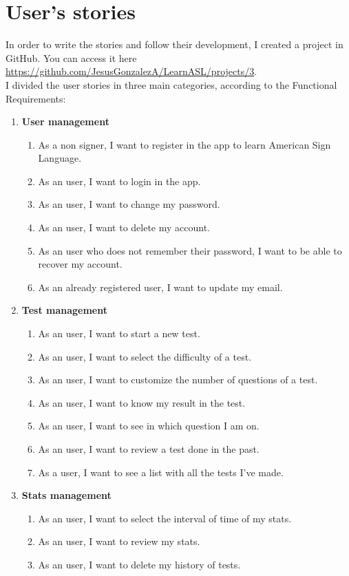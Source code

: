 \section{User's stories}
In order to write the stories and follow their development, I created a project in GitHub. You can access it here \url{https://github.com/JesusGonzalezA/LearnASL/projects/3}. \\

I divided the user stories in three main categories, according to the Functional Requirements:
\begin{enumerate}[label=\textbf{US\_\arabic*}, align=left, leftmargin=*]
    \item \textbf{User management} 
        \begin{enumerate}[label=\textbf{\theenumi.\arabic*}, align=left, leftmargin=*]
            \item As a non signer, I want to register in the app to learn American Sign Language.
            \item As an user, I want to login in the app.
            \item As an user, I want to change my password.
            \item As an user, I want to delete my account.
            \item As an user who does not remember their password, I want to be able to recover my account.
            \item As an already registered user, I want to update my email.
        \end{enumerate}
    \item \textbf{Test management} 
        \begin{enumerate}[label=\textbf{\theenumi.\arabic*}, align=left, leftmargin=*]
            \item As an user, I want to start a new test.
            \item As an user, I want to select the difficulty of a test.
            \item As an user, I want to customize the number of questions of a test.
            \item As an user, I want to know my result in the test.
            \item As an user, I want to see in which question I am on.
            \item As an user, I want to review a test done in the past.
            \item As a user, I want to see a list with all the tests I've made.
        \end{enumerate}
    \item \textbf{Stats management}
        \begin{enumerate}[label=\textbf{\theenumi.\arabic*}, align=left, leftmargin=*]
            \item As an user, I want to select the interval of time of my stats.
            \item As an user, I want to review my stats.
            \item As an user, I want to delete my history of tests.
        \end{enumerate}
\end{enumerate}


